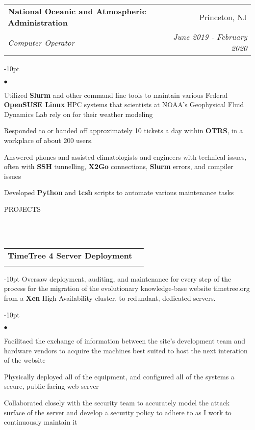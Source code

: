 \documentclass[12pt]{article}
\makeatletter
\newcommand{\header}[1]{
	\vspace*{12pt} %
	{\hspace*{-14pt}\vspace*{6pt} #1}
	\vspace*{-6pt} 
	\lineunder
}
\newcommand{\lineunder}{
	\vspace*{-8pt} \\ 
	\hspace*{-18pt} 
	\hrulefill \\
}
\newcommand{\subheading}[4]{
 	\vspace{5pt}
    	\begin{tabular*}{1.01\textwidth}
    		{l@{\extracolsep{\fill}}r}
      		\hspace{-16pt}\textbf{#1} & #2 \\
      		\hspace{-16pt}\textit{\small#3} & \textit{\small #4} \\
    	\end{tabular*}
    \vspace{-4pt}
}
\newenvironment{achievements}{
\begin{adjustwidth}{-10pt}{}
  \begin{list}{$\bullet$}{
  	\topsep 0pt \itemsep -4pt}}
  	{\vspace*{2pt}\end{list}
\end{adjustwidth}
}
\makeatother
\begin{document}
\subheading
	{National Oceanic and Atmospheric Administration}{Princeton, NJ}
	{Computer Operator}{June 2019 - February 2020}
	\begin{achievements}
		\item Utilized \textbf{Slurm} and other command line tools to maintain various Federal \textbf{OpenSUSE Linux} HPC systems that scientists at NOAA's Geophysical Fluid Dynamics Lab rely on for their weather modeling
		\item Responded to or handed off approximately 10 tickets a day within \textbf{OTRS}, in a workplace of about 200 users.	
		\item Answered phones and assisted climatologists and engineers with technical issues, often with \textbf{SSH} tunnelling, \textbf{X2Go} connections, \textbf{Slurm} errors, and compiler issues
		\item Developed \textbf{Python} and \textbf{tcsh} scripts to automate various maintenance tasks
		
		
	\end{achievements}


\vspace{-8pt}
\header{PROJECTS}

	
\subheading{TimeTree 4 Server Deployment}{}{}{}
	\vspace{-15pt}
	\begin{adjustwidth}{-10pt}{}
	Oversaw deployment, auditing, and maintenance for every step of the process for the migration of the evolutionary knowledge-base website timetree.org from a \textbf{Xen} High Availability cluster, to redundant, dedicated servers.
	\end{adjustwidth}
	\begin{achievements}		
		\item Facilitaed the exchange of information between the site's development team and hardware vendors to acquire the machines best suited to host the next interation of the website
		\item Physically deployed all of the equipment, and configured all of the systems a secure, public-facing web server
		\item Collaborated closely with the security team to accurately model the attack surface of the server and develop a security policy to adhere to as I work to continuously maintain it
	\end{achievements}
\end{document}
